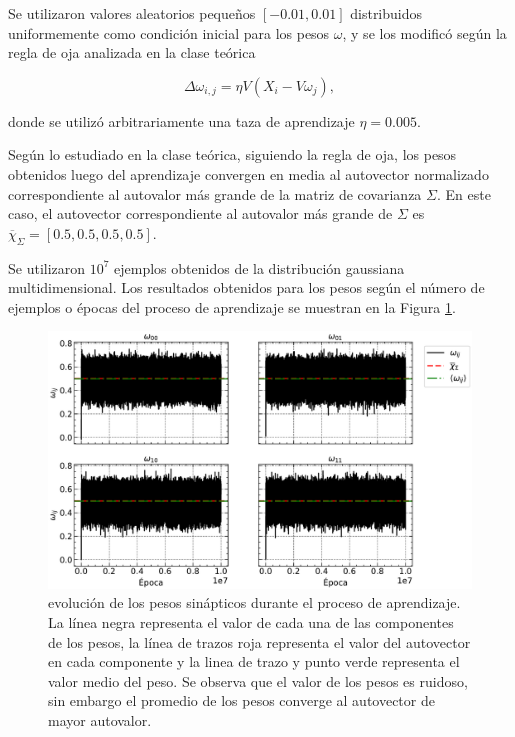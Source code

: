 \documentclass[11pt, twocolumn]{article}
\begin{document}
Se utilizaron valores aleatorios pequeños \([-0.01, 0.01]\) distribuidos uniformemente como condición inicial para los pesos \(\omega\), y se los modificó según la regla de oja analizada en la clase teórica

\begin{equation} \nonumber
    \Delta \omega_{i,j} = \eta V (X_i - V \omega_j), 
\end{equation}

\noindent donde se utilizó arbitrariamente una taza de aprendizaje \(\eta = 0.005\).

Según lo estudiado en la clase teórica, siguiendo la regla de oja, los pesos obtenidos luego del aprendizaje convergen en media al autovector normalizado correspondiente al autovalor más grande de la matriz de covarianza \(\Sigma\). En este caso, el autovector correspondiente al autovalor más grande de \(\Sigma\) es \(\overline{\chi}_{\Sigma} = [0.5, 0.5, 0.5, 0.5]\). 


Se utilizaron \(10^7\) ejemplos obtenidos de la distribución gaussiana multidimensional. Los resultados obtenidos para los pesos según el número de ejemplos o épocas del proceso de aprendizaje se muestran en la Figura \ref{fig:ej1_pesos}.

\begin{figure} [t]
    \centering
    \includegraphics[width=\textwidth]{figures/ej_1.pdf}
    \caption{evolución de los pesos sinápticos durante el proceso de aprendizaje. La línea negra representa el valor de cada una de las componentes de los pesos, la línea de trazos roja representa el valor del autovector en cada componente y la linea de trazo y punto verde representa el valor medio del peso. Se observa que el valor de los pesos es ruidoso, sin embargo el promedio de los pesos converge al autovector de mayor autovalor.}
    \label{fig:ej1_pesos}
\end{figure}
\end{document}
